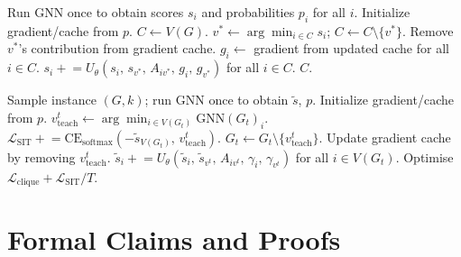 \documentclass[mathematics,article,submit,pdftex,moreauthors]{Definitions/mdpi}
\begin{document}
\begin{algorithm}[H]
  \caption{U-LPR: Cached-Deletion Decoder}
  \label{alg:gub}
  \begin{algorithmic}[1]
    \State Run GNN once to obtain scores $s_i$ and probabilities $p_i$ for all $i$.
    \State Initialize gradient/cache from $p$. \hfill{}
    \State $C \leftarrow V(G)$.
    \State $v^* \leftarrow \arg\min_{i \in C} s_i$;\;
    $C \leftarrow C \setminus \{v^*\}$.
    \State Remove $v^*$'s contribution from gradient cache. \hfill{}
    \State $g_i \leftarrow$ gradient from updated cache for all $i \in C$.
    \hfill{}
    \State $s_i \mathrel{+}= U_\theta(s_i,\, s_{v^*},\, A_{iv^*},\, g_i,\,
    g_{v^*})$ for all $i \in C$. \hfill{}
    \EndWhile
    \State \Return $C$.
  \end{algorithmic}
\end{algorithm}

\begin{algorithm}[H]
  \caption{SIT Training Step}
  \label{alg:sit_training}
  \begin{algorithmic}[1]
    \State Sample instance $(G, k)$; run GNN once to obtain $\tilde{s}$, $p$.
    \State Initialize gradient/cache from $p$.
    \hfill{}
    \State $v^t_{\mathrm{teach}} \leftarrow \arg\min_{i \in V(G_t)}
    \mathrm{GNN}(G_t)_i$. \hfill{}
    \State $\mathcal{L}_{\mathrm{SIT}} \mathrel{+}=
    \mathrm{CE}_{\mathrm{softmax}}(-\tilde{s}_{V(G_t)},\,
    v^t_{\mathrm{teach}})$.
    \hfill{}
    \State $G_t \leftarrow G_t \setminus \{v^t_{\mathrm{teach}}\}$.
    \State Update gradient cache by removing $v^t_{\mathrm{teach}}$.
    \hfill{}
    \State $\tilde{s}_i \mathrel{+}= U_\theta(\tilde{s}_i,\,
    \tilde{s}_{v^t},\, A_{iv^t},\, \gamma_i,\, \gamma_{v^t})$
    for all $i \in V(G_t)$.
    \EndFor
    \State Optimise $\mathcal{L}_{\mathrm{clique}} +
    \mathcal{L}_{\mathrm{SIT}} / T$.
  \end{algorithmic}
\end{algorithm}

\section{Formal Claims and Proofs}
\label{app:proofs}
\end{document}
